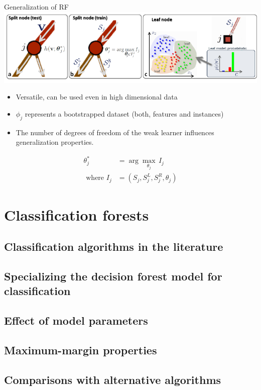 \documentclass[11pt,aspectratio=1610,usenames,dvipsnames]{beamer} %
\begin{document}
\begin{frame}{Generalization of RF}%
	\includegraphics[scale = 0.90]{figures/decisionForests-5.pdf}
	\begin{itemize}%
		\item Versatile, can be used even in high dimensional data
		\item $ \phi_{j} $ represents a bootstrapped dataset (both, features and instances)
		\item The number of degrees of freedom of the weak learner influences generalization properties.
	\end{itemize}%
	\begin{align*}%
	\theta_{j}^{\ast} &= \arg \underset{\theta_{j}}{\max} \,I_{j} \\
	\text{ where } I_{j}&=\left(S_{j},S_{j}^{L},S_{j}^{R},\theta_{j}\right)
\end{align*}%
\end{frame}%


\section{Classification forests}%
\subsection{Classification algorithms in the literature}%
\subsection{Specializing the decision forest model for classification}%
\subsection{Effect of model parameters}%
\subsection{Maximum-margin properties}%
\subsection{Comparisons with alternative algorithms}%
\end{document}
